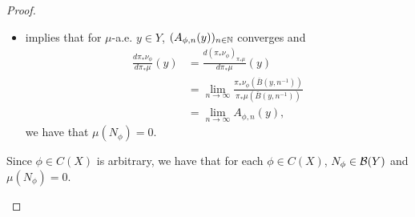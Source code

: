 \documentclass{book}
\begin{document}
\begin{proof}
\begin{itemize}
\begin{itemize}
			$$N_{\phi} = N_{\phi}' \cup \bigg\{ y \in (N_{\phi}')^c: \limn [A_{\phi,n}\chi_{N_{\phi}'}](y) \neq \frac{d\pi_*\nu_{\phi}}{d\pi_*\mu} \chi_{N_{\phi}' (y)} \bigg\},$$ 
			we have that $N_{\phi} \in \MB(Y)$.  
			\item {} implies that for $\mu$-a.e. $y \in Y$, $(A_{\phi,n}(y))_{n \in \mathbb{N}}$ converges and
			\begin{align*}
				\frac{d\pi_*\nu_{\phi}}{d\pi_*\mu}(y)
				& = \frac{d(\pi_*\nu_{\phi})_{\pi_*\mu}}{d\pi_*\mu}(y) \\
				& = \lim_{n \rightarrow \infty} \frac{ \pi_*\nu_{\phi}(\bar{B}(y, n^{-1}))}{\pi_*\mu(\bar{B}(y, n^{-1}))} \\
				& = \lim_{n \rightarrow \infty} A_{\phi,n}(y),
			\end{align*}
			we have that $\mu(N_{\phi}) = 0$. 
		\end{itemize}
		Since $\phi \in C(X)$ is arbitrary, we have that for each $\phi \in C(X)$, $N_{\phi} \in \MB(Y)$ and $\mu(N_{\phi}) = 0$.
	\end{itemize}
	
	
	
	
%	
	

\end{proof}
\end{document}
